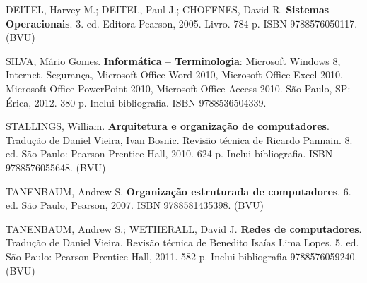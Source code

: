 \begin{pud}
\begin{bibbasica}
	\end{bibbasica}
	
	\begin{bibcomplementar}
		\item DEITEL, Harvey M.; DEITEL, Paul J.; CHOFFNES, David R. \textbf{Sistemas Operacionais}. 3. ed. Editora Pearson, 2005. Livro.  784 p.  ISBN 9788576050117. (BVU)
  		\item  SILVA, Mário Gomes. \textbf{Informática -- Terminologia}: Microsoft Windows 8, Internet, Segurança, Microsoft Office Word 2010, Microsoft Office Excel 2010, Microsoft Office PowerPoint 2010, Microsoft Office Access 2010. São Paulo, SP: Érica, 2012. 380 p. Inclui bibliografia. ISBN 9788536504339.
		\item STALLINGS, William. \textbf{Arquitetura e organização de computadores}. Tradução de Daniel Vieira, Ivan Bosnic. Revisão técnica de Ricardo Pannain. 8. ed. São Paulo: Pearson Prentice Hall, 2010. 624 p. Inclui bibliografia. ISBN 9788576055648.  (BVU)
		\item TANENBAUM, Andrew S. \textbf{Organização estruturada de computadores}. 6. ed. São Paulo, Pearson, 2007. ISBN 9788581435398. (BVU)
        \item  TANENBAUM, Andrew S.; WETHERALL, David J.  \textbf{Redes de computadores}. Tradução de Daniel Vieira. Revisão técnica de Benedito Isaías Lima Lopes. 5. ed. São Paulo: Pearson Prentice Hall, 2011. 582 p. Inclui bibliografia 9788576059240. (BVU)
	
	\end{bibcomplementar}
	
\end{pud}



